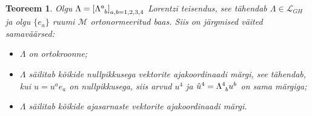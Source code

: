 \documentclass[a4paper,12pt]{article}
\theoremstyle{plain}
\newtheorem{teoreem}{Teoreem}[section]
\theoremstyle{definition}
\numberwithin{equation}{section}
\def\L{{\mathcal L}}
\def\M{{\mathcal M}}
\begin{document}
\begin{teoreem}\textnormal{\cite[teoreem 1.3.3]{Naber}}
Olgu $\Lambda = \left[\Lambda\indices{^a_b}\right]_{a,b = 1,2,3,4}$ Lorentzi teisendus, see tähendab $\Lambda \in \L_{GH}$ ja olgu $\{e_a\}$ ruumi $\M$ orto\-normeeritud baas. Siis on järgmised väited samaväärsed:
\begin{itemize}
\item[(i)] $\Lambda$ on ortokroonne;
\item[(ii)] $\Lambda$ säilitab kõikide nullpikkusega vektorite ajakoordinaadi märgi, see tähendab, kui $u = u^a e_a$ on nullpikkusega, siis arvud $u^4$ ja $\hat{u}^4 = \Lambda\indices{^4_b} u^b$ on sama märgiga;
\item[(iii)] $\Lambda$ säilitab kõikide ajasarnaste vektorite ajakoordinaadi märgi.
\end{itemize}
\end{teoreem}
\end{document}
